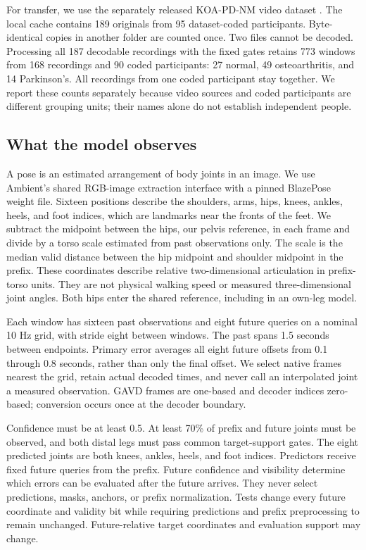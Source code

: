 \documentclass[letterpaper]{article}
\begin{document}
For transfer, we use the separately released KOA-PD-NM video dataset \citep{kour2020,kour2022}. The local cache contains 189 originals from 95 dataset-coded participants. Byte-identical copies in another folder are counted once. Two files cannot be decoded. Processing all 187 decodable recordings with the fixed gates retains 773 windows from 168 recordings and 90 coded participants: 27 normal, 49 osteoarthritis, and 14 Parkinson's. All recordings from one coded participant stay together. We report these counts separately because video sources and coded participants are different grouping units; their names alone do not establish independent people.

\subsection{What the model observes}

A pose is an estimated arrangement of body joints in an image. We use Ambient's shared RGB-image extraction interface with a pinned BlazePose weight file. Sixteen positions describe the shoulders, arms, hips, knees, ankles, heels, and foot indices, which are landmarks near the fronts of the feet. We subtract the midpoint between the hips, our pelvis reference, in each frame and divide by a torso scale estimated from past observations only. The scale is the median valid distance between the hip midpoint and shoulder midpoint in the prefix. These coordinates describe relative two-dimensional articulation in prefix-torso units. They are not physical walking speed or measured three-dimensional joint angles. Both hips enter the shared reference, including in an own-leg model.

Each window has sixteen past observations and eight future queries on a nominal 10 Hz grid, with stride eight between windows. The past spans 1.5 seconds between endpoints. Primary error averages all eight future offsets from 0.1 through 0.8 seconds, rather than only the final offset. We select native frames nearest the grid, retain actual decoded times, and never call an interpolated joint a measured observation. GAVD frames are one-based and decoder indices zero-based; conversion occurs once at the decoder boundary.

Confidence must be at least 0.5. At least 70\% of prefix and future joints must be observed, and both distal legs must pass common target-support gates. The eight predicted joints are both knees, ankles, heels, and foot indices. Predictors receive fixed future queries from the prefix. Future confidence and visibility determine which errors can be evaluated after the future arrives. They never select predictions, masks, anchors, or prefix normalization. Tests change every future coordinate and validity bit while requiring predictions and prefix preprocessing to remain unchanged. Future-relative target coordinates and evaluation support may change.
\end{document}
